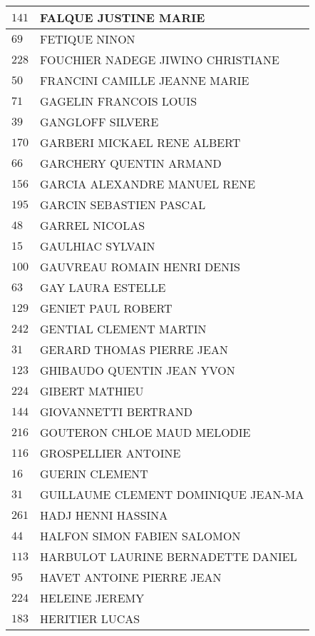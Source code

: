 \begin{xltabular}{\linewidth}{|l|X|}
    \hline
    $141$ & FALQUE JUSTINE MARIE \\
    \hline
    $69$ & FETIQUE NINON \\
    \hline
    $228$ & FOUCHIER NADEGE JIWINO CHRISTIANE \\
    \hline
    $50$ & FRANCINI CAMILLE JEANNE MARIE \\
    \hline
    $71$ & GAGELIN FRANCOIS LOUIS \\
    \hline
    $39$ & GANGLOFF SILVERE \\
    \hline
    $170$ & GARBERI MICKAEL RENE ALBERT \\
    \hline
    $66$ & GARCHERY QUENTIN ARMAND \\
    \hline
    $156$ & GARCIA ALEXANDRE MANUEL RENE \\
    \hline
    $195$ & GARCIN SEBASTIEN PASCAL \\
    \hline
    $48$ & GARREL NICOLAS \\
    \hline
    $15$ & GAULHIAC SYLVAIN \\
    \hline
    $100$ & GAUVREAU ROMAIN HENRI DENIS \\
    \hline
    $63$ & GAY LAURA ESTELLE \\
    \hline
    $129$ & GENIET PAUL ROBERT \\
    \hline
    $242$ & GENTIAL CLEMENT MARTIN \\
    \hline
    $31$ & GERARD THOMAS PIERRE JEAN \\
    \hline
    $123$ & GHIBAUDO QUENTIN JEAN YVON \\
    \hline
    $224$ & GIBERT MATHIEU \\
    \hline
    $144$ & GIOVANNETTI BERTRAND \\
    \hline
    $216$ & GOUTERON CHLOE MAUD MELODIE \\
    \hline
    $116$ & GROSPELLIER ANTOINE \\
    \hline
    $16$ & GUERIN CLEMENT \\
    \hline
    $31$ & GUILLAUME CLEMENT DOMINIQUE JEAN-MA \\
    \hline
    $261$ & HADJ HENNI HASSINA \\
    \hline
    $44$ & HALFON SIMON FABIEN SALOMON \\
    \hline
    $113$ & HARBULOT LAURINE BERNADETTE DANIEL \\
    \hline
    $95$ & HAVET ANTOINE PIERRE JEAN \\
    \hline
    $224$ & HELEINE JEREMY \\
    \hline
    $183$ & HERITIER LUCAS \\

\end{xltabular}
